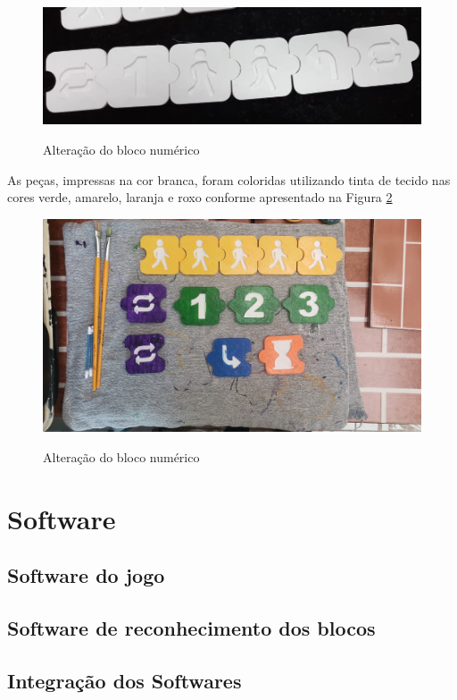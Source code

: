     \begin{figure}[H]
        \caption{Alteração do bloco numérico}
        \centering
        \includegraphics[width=\linewidth]{Imagens/Cap4/alteracao_bloco_numerico.jpg}
        \label{figura:alteracao_bloco_numerico}
    \end{figure}
    
    As peças, impressas na cor branca, foram coloridas utilizando tinta de tecido nas cores verde, amarelo, laranja e roxo conforme apresentado na Figura \ref{figura:blocos_pintados}
    
    \begin{figure}[H]
        \caption{Alteração do bloco numérico}
        \centering
        \includegraphics[width=\linewidth]{Imagens/Cap4/blocos_pintados.jpeg}
        \label{figura:blocos_pintados}
    \end{figure}

\section{Software}

    \subsection{Software do jogo}
    
    \subsection{Software de reconhecimento dos blocos}
    
    \subsection{Integração dos Softwares}
    